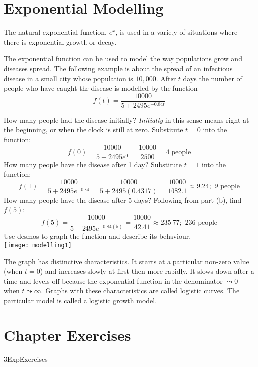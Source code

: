 \section{Exponential Modelling}
The natural exponential function, $e^x$, is used in a variety of situations where there is exponential growth or decay. 

\example The exponential function can be used to model the way populations grow and diseases spread. The following
example is about the spread of an infectious disease in a small city whose population is $10,000$. After $t$ days the number of people who have caught the disease is modelled by the function
\begin{equation*}f (t) =\frac{10000}{5 +2495 e^{ -0.84 t}}
\end{equation*}


\begin{tasks}
	\task How many people had the disease initially?
	\textit{Initially} in this sense means right at the beginning, or when the clock is still at zero. Substitute $t=0$ into the function:
	\[f(0)=\frac{10000}{5+2495e^0}=\frac{10000}{2500}=4\text{ people}\]
	\task How many people have the disease after 1 day?
	Substitute $t=1$ into the function:
	\[f(1)=\frac{10000}{5+2495e^{-0.84}}=\frac{10000}{5+2495(0.4317)}=\frac{10000}{1082.1}\approx 9.24;\text{ 9 people}\]
	\task How many people have the disease after 5 days? 
	Following from part (b), find $f(5)$:\\
	\[f(5)=\frac{10000}{5+2495e^{-0.84(5)}}=\frac{10000}{42.41}\approx 235.77;\text{ 236 people}\]	
	\task Use desmos to graph the function and describe its behaviour. \\
	\texttt{[image: modelling1]}
\end{tasks}

The graph has distinctive characteristics. It starts at a particular non-zero value (when $t =0$) and increases slowly at first then more rapidly. It slows down after a time and levels off because the exponential function in the denominator $ \leadsto 0$ when $t \leadsto \infty $. Graphs with these characteristics are called logistic curves. The particular model is called a logistic growth model. 

\section{Chapter Exercises}
{3ExpExercises}

